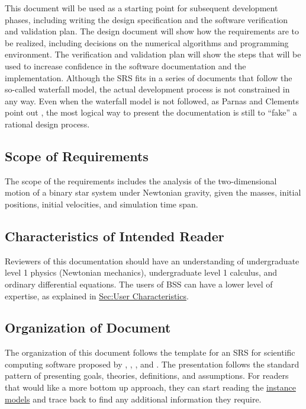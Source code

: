 \documentclass[12pt]{article}
\begin{document}
This document will be used as a starting point for subsequent development phases, including writing the design specification and the software verification and validation plan. The design document will show how the requirements are to be realized, including decisions on the numerical algorithms and programming environment. The verification and validation plan will show the steps that will be used to increase confidence in the software documentation and the implementation. Although the SRS fits in a series of documents that follow the so-called waterfall model, the actual development process is not constrained in any way. Even when the waterfall model is not followed, as Parnas and Clements point out \cite{parnasClements1986}, the most logical way to present the documentation is still to ``fake'' a rational design process.

\subsection{Scope of Requirements}
\label{Sec:ReqsScope}
The scope of the requirements includes the analysis of the two-dimensional motion of a binary star system under Newtonian gravity, given the masses, initial positions, initial velocities, and simulation time span.

\subsection{Characteristics of Intended Reader}
\label{Sec:ReaderChars}
Reviewers of this documentation should have an understanding of undergraduate level 1 physics (Newtonian mechanics), undergraduate level 1 calculus, and ordinary differential equations. The users of BSS can have a lower level of expertise, as explained in \hyperref[Sec:UserChars]{Sec:User Characteristics}.

\subsection{Organization of Document}
\label{Sec:DocOrg}
The organization of this document follows the template for an SRS for scientific computing software proposed by \cite{koothoor2013}, \cite{smithLai2005}, \cite{smithEtAl2007}, and \cite{smithKoothoor2016}. The presentation follows the standard pattern of presenting goals, theories, definitions, and assumptions. For readers that would like a more bottom up approach, they can start reading the \hyperref[Sec:IMs]{instance models} and trace back to find any additional information they require.
\end{document}
